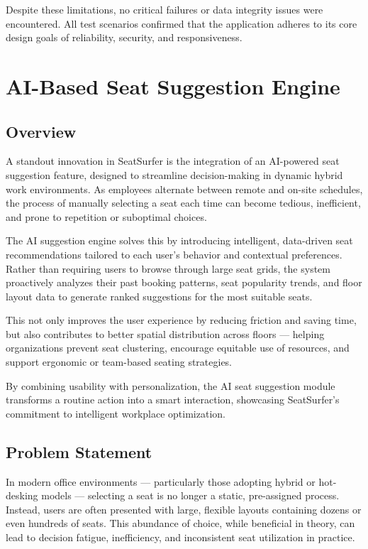 \documentclass[12pt,a4paper]{report} %
\begin{document}
Despite these limitations, no critical failures or data integrity issues were encountered. All test scenarios confirmed that the application adheres to its core design goals of reliability, security, and responsiveness.

\newpage


\section{AI-Based Seat Suggestion Engine}

\subsection{Overview}

A standout innovation in SeatSurfer is the integration of an AI-powered seat suggestion feature, designed to streamline decision-making in dynamic hybrid work environments. As employees alternate between remote and on-site schedules, the process of manually selecting a seat each time can become tedious, inefficient, and prone to repetition or suboptimal choices.

The AI suggestion engine solves this by introducing intelligent, data-driven seat recommendations tailored to each user's behavior and contextual preferences. Rather than requiring users to browse through large seat grids, the system proactively analyzes their past booking patterns, seat popularity trends, and floor layout data to generate ranked suggestions for the most suitable seats.

This not only improves the user experience by reducing friction and saving time, but also contributes to better spatial distribution across floors — helping organizations prevent seat clustering, encourage equitable use of resources, and support ergonomic or team-based seating strategies.

By combining usability with personalization, the AI seat suggestion module transforms a routine action into a smart interaction, showcasing SeatSurfer's commitment to intelligent workplace optimization.

\subsection{Problem Statement}

In modern office environments — particularly those adopting hybrid or hot-desking models — selecting a seat is no longer a static, pre-assigned process. Instead, users are often presented with large, flexible layouts containing dozens or even hundreds of seats. This abundance of choice, while beneficial in theory, can lead to decision fatigue, inefficiency, and inconsistent seat utilization in practice.
\end{document}
